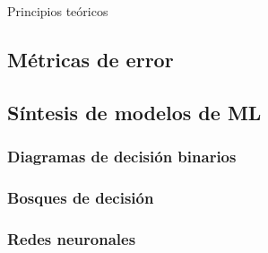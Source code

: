 Principios teóricos

\subsection{Métricas de error}

\subsection{Síntesis de modelos de ML}

\subsubsection{Diagramas de decisión binarios}

\subsubsection{Bosques de decisión}

\subsubsection{Redes neuronales}
